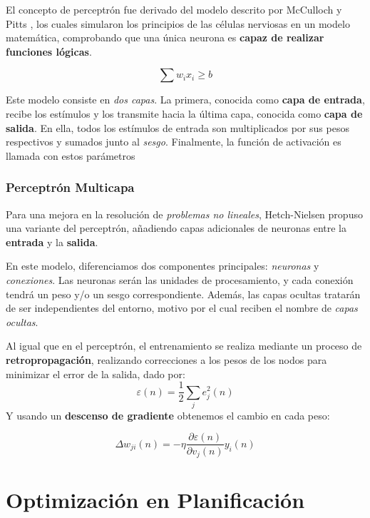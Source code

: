 El concepto de perceptrón fue derivado del modelo descrito por McCulloch y Pitts \cite{McCulloh1943ANets}, los cuales simularon los principios de las células nerviosas en un modelo matemática, comprobando que una única neurona es \textbf{capaz de realizar funciones lógicas}.

\begin{equation}
\sum w_{i}x_{i} \ge b
\end{equation}

Este modelo consiste en \textit{dos capas}. La primera, conocida como \textbf{capa de entrada}, recibe los estímulos y los transmite hacia la última capa, conocida como \textbf{capa de salida}. En ella, todos los estímulos de entrada son multiplicados por sus pesos respectivos y sumados junto al \textit{sesgo}. Finalmente, la función de activación es llamada con estos parámetros 


\subsubsection{Perceptrón Multicapa}

Para una mejora en la resolución de \textit{problemas no lineales}, Hetch-Nielsen propuso una variante del perceptrón, añadiendo capas adicionales de neuronas entre la \textbf{entrada} y la \textbf{salida}\cite{Hecht-Nielsen1989Neurocomputing}.


En este modelo, diferenciamos dos componentes principales: \textit{neuronas} y \textit{conexiones}. Las neuronas serán las unidades de procesamiento, y cada conexión tendrá un peso y/o un sesgo correspondiente. Además, las capas ocultas tratarán de ser independientes del entorno, motivo por el cual reciben el nombre de \textit{capas ocultas}.

Al igual que en el perceptrón, el entrenamiento se realiza mediante un proceso de \textbf{retropropagación}, realizando correcciones a los pesos de los nodos para minimizar el error de la salida, dado por\cite{Haykin1998NeuralFoundation}:
\begin{equation}
    \varepsilon (n) = \frac{1}{2}\sum_{j}e_{j}^2(n)
\end{equation}
Y usando un \textbf{descenso de gradiente} obtenemos el cambio en cada peso\cite{Haykin1998NeuralFoundation}:

\begin{equation}
    \Delta w_{ji}(n) = -\eta \frac{\partial \varepsilon (n)}{\partial v_{j}(n)}y_{i}(n)
\end{equation}


\newpage

\section{Optimización en Planificación}

